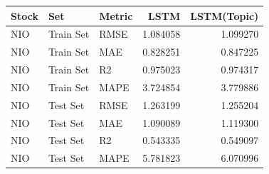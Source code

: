 \begin{tabular}{lllrr}
\toprule
Stock & Set & Metric & LSTM & LSTM(Topic) \\
\midrule
NIO & Train Set & RMSE & 1.084058 & 1.099270 \\
NIO & Train Set & MAE & 0.828251 & 0.847225 \\
NIO & Train Set & R2 & 0.975023 & 0.974317 \\
NIO & Train Set & MAPE & 3.724854 & 3.779886 \\
NIO & Test Set & RMSE & 1.263199 & 1.255204 \\
NIO & Test Set & MAE & 1.090089 & 1.119300 \\
NIO & Test Set & R2 & 0.543335 & 0.549097 \\
NIO & Test Set & MAPE & 5.781823 & 6.070996 \\
\bottomrule
\end{tabular}
